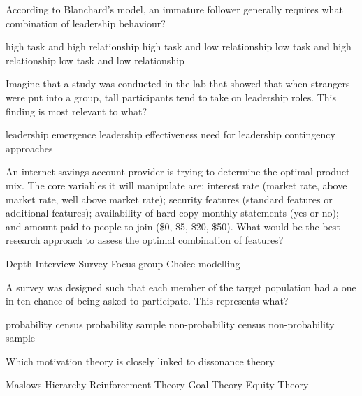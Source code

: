 \documentclass[12pt, a4paper]{exam}\usepackage[]{graphicx}\usepackage[]{color}
\begin{document}
\begin{questions}
\filbreak
\question
 According to Blanchard's model, an immature follower generally requires what combination of leadership behaviour?
\begin{choices}
\choice high task and high relationship
\choice high task and low relationship
\choice low task and high relationship
\choice low task and low relationship
\vspace{10 mm}
\end{choices}


\filbreak
\question
 Imagine that a study was conducted in the lab that showed that when strangers were put into a group, tall participants tend to take on leadership roles. This finding is most relevant to what?
\begin{choices}
\choice leadership emergence
\choice leadership effectiveness
\choice need for leadership
\choice contingency approaches
\vspace{10 mm}
\end{choices}


\filbreak
\question
 An internet savings account provider is trying to determine the optimal product mix. The core variables it will manipulate are: interest rate (market rate, above market rate, well above market rate); security features (standard features or additional features); availability of hard copy monthly statements (yes or no); and amount paid to people to join (\$0, \$5, \$20, \$50). What would be the best research approach to assess the optimal combination of features?
\begin{choices}
\choice Depth Interview
\choice Survey
\choice Focus group
\choice Choice modelling
\vspace{10 mm}
\end{choices}


\filbreak
\question
 A survey was designed such that each member of the target population had a one in ten chance of being asked to participate. This represents what?
\begin{choices}
\choice probability census
\choice probability sample
\choice non-probability census
\choice non-probability sample
\vspace{10 mm}
\end{choices}


\filbreak
\question
 Which motivation theory is closely linked to dissonance theory
\begin{choices}
\choice Maslows Hierarchy
\choice Reinforcement Theory
\choice Goal Theory
\choice Equity Theory
\vspace{10 mm}
\end{choices}



\end{questions}
\end{document}
